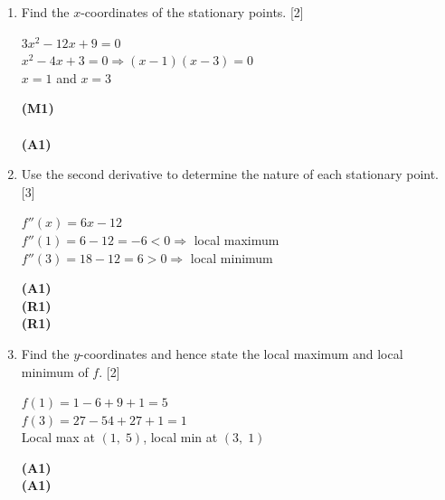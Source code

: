 \documentclass[12pt, twoside]{article}
\begin{document}
\begin{enumerate}[itemsep=0.2cm]
\begin{enumerate}[itemsep=0.3cm]
  \medskip
  \item Find the $x$-coordinates of the stationary points. \hfill [2]

  \begin{minipage}[t]{0.62\textwidth}
  $3x^2 - 12x + 9 = 0$\\[0.15cm]
  $x^2 - 4x + 3 = 0 \Rightarrow (x - 1)(x - 3) = 0$\\[0.15cm]
  $x = 1$ and $x = 3$
  \end{minipage}%
  \begin{minipage}[t]{0.35\textwidth}\raggedleft
  \textbf{(M1)}\\[0.15cm]
  ~\\[0.15cm]
  \textbf{(A1)}
  \end{minipage}

  \medskip
  \item Use the second derivative to determine the nature of each
        stationary point. \hfill [3]

  \begin{minipage}[t]{0.62\textwidth}
  $f''(x) = 6x - 12$\\[0.15cm]
  $f''(1) = 6 - 12 = -6 < 0 \Rightarrow$ local maximum\\[0.15cm]
  $f''(3) = 18 - 12 = 6 > 0 \Rightarrow$ local minimum
  \end{minipage}%
  \begin{minipage}[t]{0.35\textwidth}\raggedleft
  \textbf{(A1)}\\[0.15cm]
  \textbf{(R1)}\\[0.15cm]
  \textbf{(R1)}
  \end{minipage}

  \medskip
  \item Find the $y$-coordinates and hence state the local maximum
        and local minimum of $f$. \hfill [2]

  \begin{minipage}[t]{0.62\textwidth}
  $f(1) = 1 - 6 + 9 + 1 = 5$\\[0.15cm]
  $f(3) = 27 - 54 + 27 + 1 = 1$\\[0.15cm]
  Local max at $(1,\; 5)$, local min at $(3,\; 1)$
  \end{minipage}%
  \begin{minipage}[t]{0.35\textwidth}\raggedleft
  \textbf{(A1)}\\[0.15cm]
  \textbf{(A1)}
  \end{minipage}
\end{enumerate}

\end{enumerate}
\end{document}
